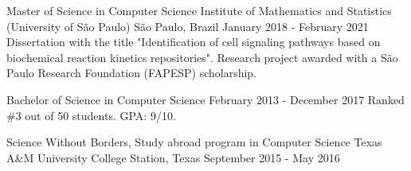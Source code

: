 \documentclass[11pt, a4paper]{awesome-cv-res}
\begin{document}
\begin{cventries}
\cventry
{Master of Science in Computer Science}
{Institute of Mathematics and Statistics (University of São Paulo)} %
{São Paulo, Brazil} %
{January 2018 - February 2021}
{Dissertation with the title "Identification of cell signaling pathways 
based on biochemical reaction kinetics repositories". Research project 
awarded with a São Paulo Research Foundation (FAPESP) scholarship.}
\newline

\cventry
{Bachelor of Science in Computer Science} %
{} %
{} %
{February 2013 - December 2017} %
{Ranked \#3 out of 50 students. GPA: 9/10.}
\newline

\cventry
{Science Without Borders, Study abroad program in Computer Science}
{Texas A\&M University}
{College Station, Texas}
{September 2015 - May 2016}
{}
\end{cventries}

\end{document}
